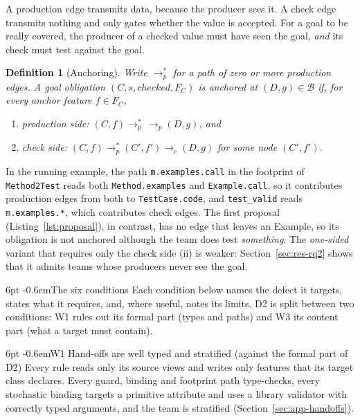 \documentclass[pdflatex,sn-mathphys-num]{sn-jnl}
\makeatletter
\theoremstyle{thmstyleone}%
\theoremstyle{thmstyletwo}%
\theoremstyle{thmstylethree}%
\newtheorem{definition}{Definition}%
\newcommand{\W}[1]{\textsf{W#1}}
\newcommand{\D}[1]{\textsf{D#1}}
\newcommand{\cls}[1]{\textsf{#1}}
\newcommand{\code}[1]{\texttt{#1}}
\renewcommand\paragraph{\@startsection{paragraph}{4}{\z@}%
  {6pt \@plus 2pt \@minus 1pt}{-0.6em}{\normalfont\normalsize\bfseries}}
\makeatother
\begin{document}
A production edge transmits data, because the producer sees it. A check edge
transmits nothing and only gates whether the value is accepted. For a goal to be really
covered, the producer of a checked value must have seen the goal, \emph{and}
its check must test against the goal.

\begin{definition}[Anchoring]\label{def:anchor}
Write $\to_p^*$ for a path of zero or more production edges. A goal obligation
$(C,s,\mathit{checked},F_C)$ is \emph{anchored} at $(D,g)\in\mathcal{B}$ if,
for every anchor feature $f\in F_C$,
\begin{enumerate}[label=(\roman*), leftmargin=2em, itemsep=1pt, topsep=2pt]
\item \emph{production side:} $(C,f)\to_p^*\,\to_p(D,g)$, and
\item \emph{check side:} $(C,f)\to_p^*(C',f')\to_c(D,g)$ for some node $(C',f')$.
\end{enumerate}
\end{definition}

In the running example, the path \code{m.examples.call} in the footprint of
\code{Method2Test} reads both \code{Method.examples} and \code{Example.call}, so
it contributes production edges from both to \code{TestCase.code}, and
\code{test\_valid} reads \code{m.examples.*}, which contributes check edges.
The first proposal (Listing~\ref{lst:proposal}), in contrast, has no edge
that leaves an \cls{Example}, so its obligation is not anchored although the
team does test \emph{something}. The \emph{one-sided} variant that requires only the check side
(ii) is weaker: Section~\ref{sec:res-rq2} shows that it admits teams whose
producers never see the goal.





\paragraph{The six conditions} Each condition below names the defect it
targets, states what it requires, and, where useful, notes its limits. \D{2}
is split between two conditions: \W{1} rules out its formal part (types and
paths) and \W{3} its content part (what a target must contain).

\paragraph{\W{1} Hand-offs are well typed and stratified (against the formal part of \D{2})}
Every rule reads only its source views and writes only features that its target
class declares. Every guard, binding and footprint path type-checks, every
stochastic binding targets a primitive attribute and uses a library validator
with correctly typed arguments, and the team is stratified
(Section~\ref{sec:app-handoffs}).
\end{document}
